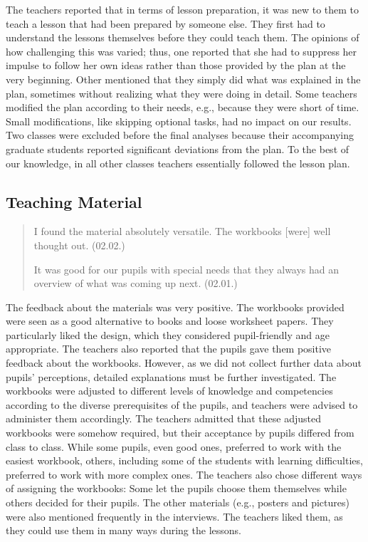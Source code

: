 \documentclass[11.5pt]{sig-alternate} %
\begin{document}
\begin{large}
The teachers reported that in terms of lesson preparation, it was new to them to teach a lesson that had been prepared by someone else. They first had to understand the lessons themselves before they could teach them. The opinions of how challenging this was varied; thus, one reported that she had to suppress her impulse to follow her own ideas rather than those provided by the plan at the very beginning. Other mentioned that they simply did what was explained in the plan, sometimes without realizing what they were doing in detail. Some teachers modified the plan according to their needs, e.g., because they were short of time. Small modifications, like skipping optional tasks, had no impact on our results. Two classes were excluded before the final analyses because their accompanying graduate students reported significant deviations from the plan. To the best of our knowledge, in all other classes teachers essentially followed the lesson plan.

\subsection*{Teaching Material}

\begin{quote}
    I found the material absolutely versatile. The workbooks [were] well thought out. (02.02.)
    
    It was good for our pupils with special needs that they always had an overview of what was coming up next. (02.01.)
\end{quote}

The feedback about the materials was very positive. The workbooks provided were seen as a good alternative to books and loose worksheet papers. They particularly liked the design, which they considered pupil-friendly and age appropriate. The teachers also reported that the pupils gave them positive feedback about the workbooks. However, as we did not collect further data about pupils’ perceptions, detailed explanations must be further investigated. The workbooks were adjusted to different levels of knowledge and competencies according to the diverse prerequisites of the pupils, and teachers were advised to administer them accordingly. The teachers admitted that these adjusted workbooks were somehow required, but their acceptance by pupils differed from class to class. While some pupils, even good ones, preferred to work with the easiest workbook, others, including some of the students with learning difficulties, preferred to work with more complex ones. The teachers also chose different ways of assigning the workbooks: Some let the pupils choose them themselves while others decided for their pupils. The other materials (e.g., posters and pictures) were also mentioned frequently in the interviews. The teachers liked them, as they could use them in many ways during the lessons.


\end{large}
\end{document}
